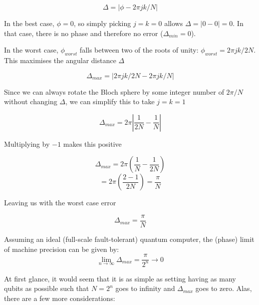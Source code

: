 \documentclass{book}
\begin{document}
$$ \Delta = | \phi - 2\pi jk/N | $$

In the best case, $\phi = 0 $, so simply picking $ j = k = 0 $ allows $\Delta = | 0 - 0 | = 0 $. In that case, there is no phase and therefore no error ($\Delta_{min} = 0$). 

In the worst case, $\phi_{worst}$ falls between two of the roots of unity: $\phi_{worst} = 2\pi jk/2N$. This maximises the angular distance $\Delta$

$$ \Delta_{max} = | 2\pi jk/2N - 2\pi jk/N | $$

Since we can always rotate the Bloch sphere by some integer number of $ 2\pi/N $ without changing $ \Delta $, we can simplify this to take $j = k = 1$

$$ \Delta_{max} = 2\pi \left| \frac{1}{2N} - \frac{1}{N} \right| $$

Multiplying by $-1$ makes this positive

$$ \Delta_{max} = 2\pi\left( \frac{1}{N} - \frac{1}{2N} \right) $$
$$ = 2\pi\left(  \frac{ 2 -1}{2N}   \right) = \frac{\pi}{N} $$

Leaving us with the worst case error 

$$ \Delta_{max} = \frac{\pi}{N} $$

Assuming an ideal (full-scale fault-tolerant) quantum computer, the (phase) limit of machine precision can be given by:
$$
\lim_{n \rightarrow \infty} \Delta_{max} = \frac{\pi}{2^n} \rightarrow 0
$$

At first glance, it would seem that it is as simple as setting having as many qubits as possible such that $N = 2^n$ goes to infinity and $\Delta_{max}$ goes to zero. Alas, there are a few more considerations:
\end{document}
